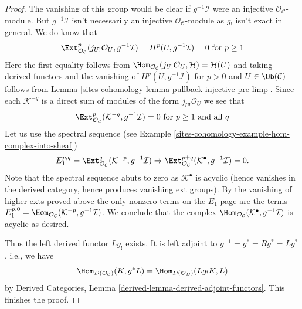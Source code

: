 \begin{proof}
\medskip\noindent
The vanishing of this group would be clear if $g^{-1}\mathcal{I}$
were an injective $\mathcal{O}_\mathcal{C}$-module. But
$g^{-1}\mathcal{I}$ isn't necessarily an injective
$\mathcal{O}_\mathcal{C}$-module as $g_!$ isn't exact in
general. We do know that
$$
\Ext^p_{\mathcal{O}_\mathcal{C}}(
j_{U!}\mathcal{O}_U, g^{-1}\mathcal{I}) =
H^p(U, g^{-1}\mathcal{I}) = 0 \text{ for }p \geq 1
$$
Here the first equality follows from
$\Hom_{\mathcal{O}_\mathcal{C}}(j_{U!}\mathcal{O}_U, \mathcal{H}) =
\mathcal{H}(U)$ and taking derived functors and the vanishing of
$H^p(U, g^{-1}\mathcal{I})$ for $p > 0$ and $U \in \Ob(\mathcal{C})$
follows from Lemma \ref{sites-cohomology-lemma-pullback-injective-pre-limp}.
Since each $\mathcal{K}^{-q}$ is a direct sum of modules of the form
$j_{U!}\mathcal{O}_U$ we see that
$$
\Ext^p_{\mathcal{O}_\mathcal{C}}(\mathcal{K}^{-q}, g^{-1}\mathcal{I}) = 0
\text{ for }p \geq 1\text{ and all }q
$$
Let us use the spectral sequence (see
Example
\ref{sites-cohomology-example-hom-complex-into-sheaf})
$$
E_1^{p, q} = \Ext^q_{\mathcal{O}_\mathcal{C}}(
\mathcal{K}^{-p}, g^{-1}\mathcal{I})
\Rightarrow
\Ext^{p + q}_{\mathcal{O}_\mathcal{C}}(
\mathcal{K}^\bullet, g^{-1}\mathcal{I}) = 0.
$$
Note that the spectral sequence abuts to zero as $\mathcal{K}^\bullet$
is acyclic (hence vanishes in the derived category, hence produces
vanishing ext groups). By the vanishing of higher exts proved above
the only nonzero terms on the $E_1$ page are the terms
$E_1^{p, 0} = \Hom_{\mathcal{O}_\mathcal{C}}(
\mathcal{K}^{-p}, g^{-1}\mathcal{I})$.
We conclude that the complex
$\Hom_{\mathcal{O}_\mathcal{C}}(
\mathcal{K}^\bullet, g^{-1}\mathcal{I})$
is acyclic as desired.

\medskip\noindent
Thus the left derived functor $Lg_!$ exists.
It is left adjoint to $g^{-1} = g^* = Rg^* = Lg^*$, i.e., we have
\begin{equation}
\label{equation-to-prove}
\Hom_{D(\mathcal{O}_\mathcal{C})}(K, g^*L) =
\Hom_{D(\mathcal{O}_\mathcal{D})}(Lg_!K, L)
\end{equation}
by Derived Categories, Lemma \ref{derived-lemma-derived-adjoint-functors}.
This finishes the proof.
\end{proof}

